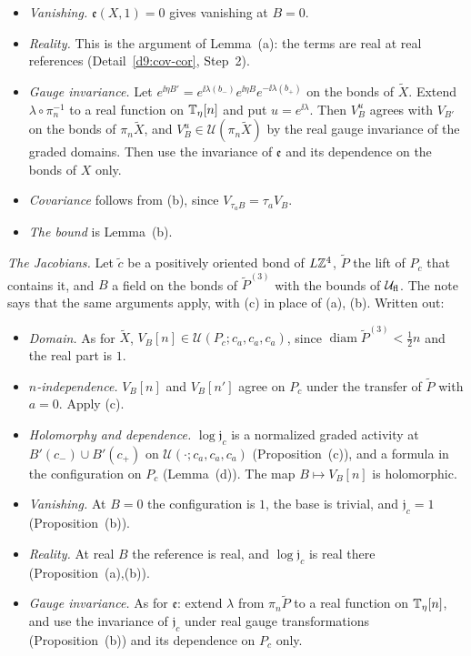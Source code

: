 \begin{detail}
\begin{step}[(d)]
\begin{itemize}
\item \emph{Vanishing.} $\mathfrak e(X,1)=0$ gives vanishing at $B=0$.
\item \emph{Reality.} This is the argument of Lemma~(a): the terms are real at real references (Detail~\ref{d9:cov-cor}, Step~2).
\item \emph{Gauge invariance.} Let $e^{\ii\eta B'}=e^{\ii\lambda(b_-)}e^{\ii\eta B}e^{-\ii\lambda(b_+)}$ on the bonds of $\tilde X$. Extend $\lambda\circ\pi_n^{-1}$ to a real function on $\mathbb T_\eta[n]$ and put $u=e^{\ii\lambda}$. Then $V_B^u$ agrees with $V_{B'}$ on the bonds of $\pi_n\tilde X$, and $V_B^u\in\mathcal U(\pi_n\tilde X)$ by the real gauge invariance of the graded domains. Then use the invariance of $\mathfrak e$ and its dependence on the bonds of $X$ only.
\item \emph{Covariance} follows from (b), since $V_{\tau_aB}=\tau_aV_B$.
\item \emph{The bound} is Lemma~(b).
\end{itemize}
\emph{The Jacobians.} Let $\tilde c$ be a positively oriented bond of $L\mathbb Z^4$, $\tilde P$ the lift of $P_c$ that contains it, and $B$ a field on the bonds of $\tilde P^{(3)}$ with the bounds of $\mathcal U_{\rm fl}$. The note says that the same arguments apply, with (c) in place of (a), (b). Written out:
\begin{itemize}
\item \emph{Domain.} As for $\tilde X$, $V_B[n]\in\mathcal U(P_c;c_a,c_a,c_a)$, since $\operatorname{diam}\tilde P^{(3)}<\frac12n$ and the real part is $1$.
\item \emph{$n$-independence.} $V_B[n]$ and $V_B[n']$ agree on $P_c$ under the transfer of $\tilde P$ with $a=0$. Apply (c).
\item \emph{Holomorphy and dependence.} $\log\mathfrak j_c$ is a normalized graded activity at $B'(c_-)\cup B'(c_+)$ on $\mathcal U(\cdot;c_a,c_a,c_a)$ (Proposition~(c)), and a formula in the configuration on $P_c$ (Lemma~(d)). The map $B\mapsto V_B[n]$ is holomorphic.
\item \emph{Vanishing.} At $B=0$ the configuration is $1$, the base is trivial, and $\mathfrak j_c=1$ (Proposition~(b)).
\item \emph{Reality.} At real $B$ the reference is real, and $\log\mathfrak j_c$ is real there (Proposition~(a),(b)).
\item \emph{Gauge invariance.} As for $\mathfrak e$: extend $\lambda$ from $\pi_n\tilde P$ to a real function on $\mathbb T_\eta[n]$, and use the invariance of $\mathfrak j_c$ under real gauge transformations (Proposition~(b)) and its dependence on $P_c$ only.

\end{itemize}
\end{step}
\end{detail}
